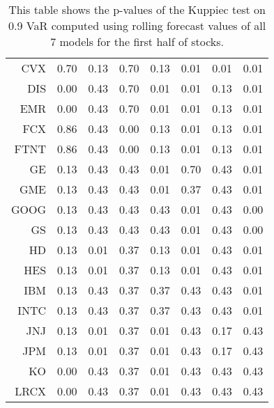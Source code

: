 \begin{table}[ht]
\begin{tabular}{rrrrrrrr}
  CVX & 0.70 & 0.13 & 0.70 & 0.13 & 0.01 & 0.01 & 0.01 \\ 
  DIS & 0.00 & 0.43 & 0.70 & 0.01 & 0.01 & 0.13 & 0.01 \\ 
  EMR & 0.00 & 0.43 & 0.70 & 0.01 & 0.01 & 0.13 & 0.01 \\ 
  FCX & 0.86 & 0.43 & 0.00 & 0.13 & 0.01 & 0.13 & 0.01 \\ 
  FTNT & 0.86 & 0.43 & 0.00 & 0.13 & 0.01 & 0.13 & 0.01 \\ 
  GE & 0.13 & 0.43 & 0.43 & 0.01 & 0.70 & 0.43 & 0.01 \\ 
  GME & 0.13 & 0.43 & 0.43 & 0.01 & 0.37 & 0.43 & 0.01 \\ 
  GOOG & 0.13 & 0.43 & 0.43 & 0.43 & 0.01 & 0.43 & 0.00 \\ 
  GS & 0.13 & 0.43 & 0.43 & 0.43 & 0.01 & 0.43 & 0.00 \\ 
  HD & 0.13 & 0.01 & 0.37 & 0.13 & 0.01 & 0.43 & 0.01 \\ 
  HES & 0.13 & 0.01 & 0.37 & 0.13 & 0.01 & 0.43 & 0.01 \\ 
  IBM & 0.13 & 0.43 & 0.37 & 0.37 & 0.43 & 0.43 & 0.01 \\ 
  INTC & 0.13 & 0.43 & 0.37 & 0.37 & 0.43 & 0.43 & 0.01 \\ 
  JNJ & 0.13 & 0.01 & 0.37 & 0.01 & 0.43 & 0.17 & 0.43 \\ 
  JPM & 0.13 & 0.01 & 0.37 & 0.01 & 0.43 & 0.17 & 0.43 \\ 
  KO & 0.00 & 0.43 & 0.37 & 0.01 & 0.43 & 0.43 & 0.43 \\ 
  LRCX & 0.00 & 0.43 & 0.37 & 0.01 & 0.43 & 0.43 & 0.43 \\ 
   \hline
\end{tabular}
\caption[Kupiec test p-values, alpha =0.9 (1)]{This table shows the p-values of the Kuppiec test on 0.9 VaR computed using rolling forecast values of all 7 models for the first half of stocks.} 
\label{Table:Kupiec_test_rolling_0.9_1}
\end{table}
